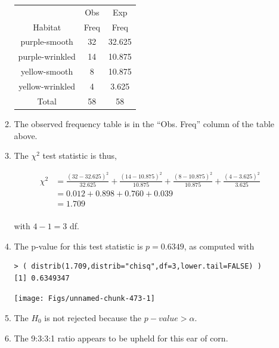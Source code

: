 \documentclass[10pt,openany]{book}\usepackage[]{graphicx}\usepackage[]{color}
\makeatletter
\newenvironment{kframe}{%
 \def\at@end@of@kframe{}%
 \ifinner\ifhmode%
  \def\at@end@of@kframe{\end{minipage}}%
  \begin{minipage}{\columnwidth}%
 \fi\fi%
 \def\FrameCommand##1{\hskip\@totalleftmargin \hskip-\fboxsep
 \colorbox{shadecolor}{##1}\hskip-\fboxsep
     \hskip-\linewidth \hskip-\@totalleftmargin \hskip\columnwidth}%
 \MakeFramed {\advance\hsize-\width
   \@totalleftmargin\z@ \linewidth\hsize
   \@setminipage}}%
 {\par\unskip\endMakeFramed%
 \at@end@of@kframe}
\newenvironment{knitrout}{}{} %
\makeatother
\begin{document}
\begin{itemize}
\begin{enumerate}
        \begin{center}
          \begin{tabular}{ccc}
            \hline\hline
            & Obs & Exp \\
            Habitat & Freq & Freq \\
            \hline
            purple-smooth   & 32 & 32.625 \\
            purple-wrinkled & 14 & 10.875 \\
            yellow-smooth   &  8 & 10.875 \\
            yellow-wrinkled &  4 &  3.625 \\
            \hline
            Total & 58 & 58 \\
            \hline\hline
          \end{tabular}
        \end{center}
      \item The observed frequency table is in the ``Obs. Freq'' column of the table above.
      \item The $\chi^{2}$ test statistic is thus,
        \begin{center}
          \[  \begin{split}
            \chi^{2} &= \frac{(32-32.625)^{2}}{32.625} + \frac{(14-10.875)^{2}}{10.875} + \frac{(8-10.875)^{2}}{10.875} + \frac{(4-3.625)^{2}}{3.625} \\
            &= 0.012 + 0.898 + 0.760 + 0.039 \\
            & = 1.709 \\
          \end{split}  \]
        \end{center}
        with $4-1=3$ df.
      \item The p-value for this test statistic is $p=0.6349$, as computed with
\begin{knitrout}
\color{fgcolor}\begin{kframe}
\begin{verbatim}
> ( distrib(1.709,distrib="chisq",df=3,lower.tail=FALSE) )
[1] 0.6349347
\end{verbatim}
\end{kframe}

{\centering \texttt{[image: Figs/unnamed-chunk-473-1]} 

}



\end{knitrout}
      \item The $H_{0}$ is not rejected because the $p-value>\alpha$.
      \item The 9:3:3:1 ratio appears to be upheld for this ear of corn.
    \end{enumerate}


\end{itemize}
\end{document}
